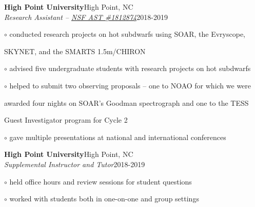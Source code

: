 \documentclass[letterpaper,12pt]{article}
\begin{document}
\vspace{2mm}
\begin{minipage}{6.1in}
\textbf{High Point University}\hfill High Point, NC\\ %
\textit{Research Assistant -- \href{https://www.nsf.gov/awardsearch/showAward?AWD_ID=1812874}{\textcolor{rotundaorange}{NSF AST \#1812874}}}\hfill 2018-2019

\hspace{0.5in} $\circ$ conducted research projects on hot subdwarfs using SOAR, the Evryscope,

\hspace{0.69in}SKYNET, and the SMARTS 1.5m/CHIRON 

\hspace{0.5in} $\circ$ advised five undergraduate students with research projects on hot subdwarfs

\hspace{0.5in} $\circ$ helped to submit two observing proposals -- one to NOAO for which we were

\hspace{0.69in}awarded four nights on SOAR's Goodman spectrograph and one to the TESS 

\hspace{0.69in}Guest Investigator program for Cycle 2

\hspace{0.5in} $\circ$ gave multiple presentations at national and international conferences

\vspace{2mm}
\textbf{High Point University}\hfill High Point, NC\\
\textit{Supplemental Instructor and Tutor}\hfill 2018-2019

\hspace{0.5in} $\circ$ held office hours and review sessions for student questions

\hspace{0.5in} $\circ$ worked with students both in one-on-one and group settings

\end{minipage}

\newpage
\vspace{3mm}
\noindent{}
\end{document}
